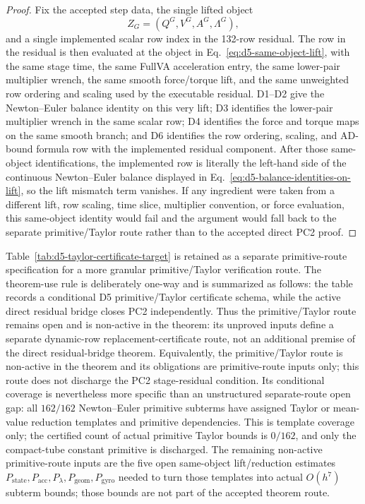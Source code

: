 \documentclass[preprint,12pt]{elsarticle}
\begin{document}
\begin{proof}
Fix the accepted step data, the single lifted object
\begin{equation}
  Z_G=(Q^G,V^G,A^G,\Lambda^G),
  \label{eq:d5-same-object-lift}
\end{equation}
and a single implemented scalar row index in the 132-row residual.  The row in
the residual is then evaluated at the object in
Eq.~\eqref{eq:d5-same-object-lift}, with the same stage time, the same FullVA acceleration entry,
the same lower-pair multiplier wrench, the same smooth force/torque lift, and
the same unweighted row ordering and scaling used by the executable residual.
D1--D2 give the Newton--Euler balance identity on this very lift; D3 identifies
the lower-pair multiplier wrench in the same scalar row; D4 identifies the
force and torque maps on the same smooth branch; and D6 identifies the row
ordering, scaling, and AD-bound formula row with the implemented residual
component.  After those same-object identifications, the implemented row is
literally the left-hand side of the continuous Newton--Euler balance displayed
in Eq.~\eqref{eq:d5-balance-identities-on-lift}, so the lift mismatch term
vanishes.  If any ingredient were taken from a different lift, row scaling,
time slice, multiplier convention, or force evaluation, this same-object
identity would fail and the argument would fall back to the separate
primitive/Taylor route rather than to the accepted direct PC2 proof.
\end{proof}

Table~\ref{tab:d5-taylor-certificate-target} is retained as a separate
primitive-route specification for a more granular primitive/Taylor
verification route.  The theorem-use rule is deliberately one-way and is
summarized as follows: the table records a conditional D5 primitive/Taylor
certificate schema, while the active direct residual bridge closes PC2
independently.  Thus the primitive/Taylor route remains open and is non-active in the theorem:
its unproved inputs define a separate dynamic-row replacement-certificate
route, not an additional premise of the direct residual-bridge theorem.
Equivalently, the primitive/Taylor route is non-active in the theorem and its
obligations are primitive-route inputs only; this route does not discharge the
PC2 stage-residual condition.  Its conditional coverage is nevertheless more
specific than an unstructured separate-route open gap: all \(162/162\)
Newton--Euler primitive subterms have assigned Taylor or mean-value reduction
templates and primitive dependencies.  This is template coverage only;
the certified count of actual primitive Taylor bounds is \(0/162\), and only the
compact-tube constant primitive is discharged.  The remaining non-active
primitive-route inputs are the five open same-object lift/reduction estimates
\(P_{\mathrm{state}},P_{\mathrm{acc}},P_{\lambda},
P_{\mathrm{geom}},P_{\mathrm{gyro}}\) needed to turn those templates into
actual \(O(h^7)\) subterm bounds; those bounds are not part of the accepted
theorem route.
\end{document}
